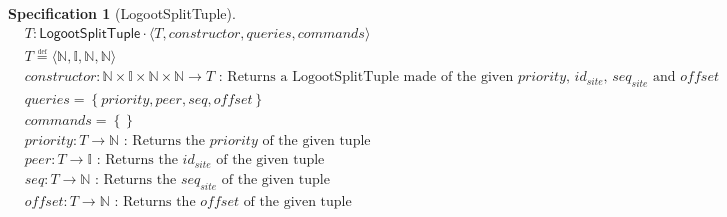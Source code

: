 \documentclass{article}
\newcommand{\commands}[1]{commands = \set{#1}}
\newcommand{\defeq}{\overset{\underset{\mathrm{def}}{}}{=}}
\newcommand{\fnspec}[3]{#1: #2 \text{ : #3}}
\newcommand{\queries}[1]{queries = \set{#1}}
\newcommand{\set}[1]{\left\{#1\right\}} %
\newcommand{\spectuple}[1]{\tuple{#1, constructor, queries, commands}}
\newcommand{\tuple}[1]{\langle #1 \rangle}
\theoremstyle{definition}
\newtheorem{specification}{Specification}
\begin{document}

\begin{specification}[LogootSplitTuple]
    \begin{align*}
    &T: \mathsf{LogootSplitTuple} \cdot \spectuple{T}\\
    &T \defeq \tuple{\mathbb{N}, \mathbb{I}, \mathbb{N}, \mathbb{N}}\\
    &\fnspec{constructor}{\mathbb{N} \times \mathbb{I} \times \mathbb{N} \times \mathbb{N} \to T}{Returns a LogootSplitTuple made of the given $priority$, $id_{site}$, $seq_{site}$ and $offset$}\\
    &\queries{priority, peer, seq, offset}\\
    &\commands{}\\
    &\fnspec{priority}{T \to \mathbb{N}}{Returns the $priority$ of the given tuple}\\
    &\fnspec{peer}{T \to \mathbb{I}}{Returns the $id_{site}$ of the given tuple}\\
    &\fnspec{seq}{T \to \mathbb{N}}{Returns the $seq_{site}$ of the given tuple}\\
    &\fnspec{offset}{T \to \mathbb{N}}{Returns the $offset$ of the given tuple}
    \end{align*}
    \label{spec:logootsplit-tuple}
\end{specification}
\end{document}

